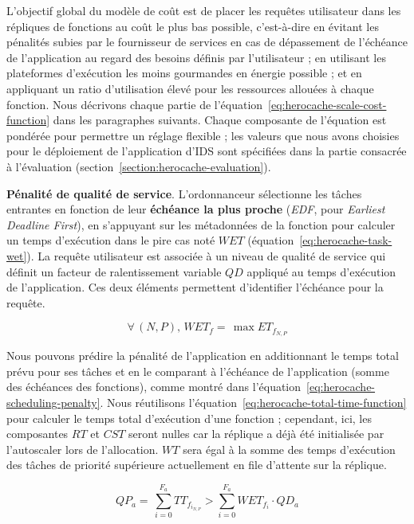 L'objectif global du modèle de coût est de placer les requêtes utilisateur dans les répliques de fonctions au coût le plus bas possible, c'est-à-dire en évitant les pénalités subies par le fournisseur de services en cas de dépassement de l'échéance de l'application au regard des besoins définis par l'utilisateur ; en utilisant les plateformes d'exécution les moins gourmandes en énergie possible ; et en appliquant un ratio d'utilisation élevé pour les ressources allouées à chaque fonction. Nous décrivons chaque partie de l'équation~\ref{eq:herocache-scale-cost-function} dans les paragraphes suivants. Chaque composante de l'équation est pondérée pour permettre un réglage flexible ; les valeurs que nous avons choisies pour le déploiement de l'application d'IDS sont spécifiées dans la partie consacrée à l'évaluation (section~\ref{section:herocache-evaluation}).

\textbf{Pénalité de qualité de service}. L'ordonnanceur sélectionne les tâches entrantes en fonction de leur \textbf{échéance la plus proche} (\textit{EDF}, pour \textit{Earliest Deadline First}), en s'appuyant sur les métadonnées de la fonction pour calculer un temps d'exécution dans le pire cas noté $WET$ (équation~\ref{eq:herocache-task-wet}). La requête utilisateur est associée à un niveau de qualité de service qui définit un facteur de ralentissement variable $QD$ appliqué au temps d'exécution de l'application. Ces deux éléments permettent d'identifier l'échéance pour la requête.

\begin{equation}
    \forall \, (N, P), \, WET_{f} = \, \max ET_{f_{N, P}}
\label{eq:herocache-task-wet}
\end{equation}

Nous pouvons prédire la pénalité de l'application en additionnant le temps total prévu pour ses tâches et en le comparant à l'échéance de l'application (somme des échéances des fonctions), comme montré dans l'équation~\ref{eq:herocache-scheduling-penalty}. Nous réutilisons l'équation~\ref{eq:herocache-total-time-function} pour calculer le temps total d'exécution d'une fonction ; cependant, ici, les composantes $RT$ et $CST$ seront nulles car la réplique a déjà été initialisée par l'autoscaler lors de l'allocation. $WT$ sera égal à la somme des temps d'exécution des tâches de priorité supérieure actuellement en file d'attente sur la réplique.

\begin{equation}
   QP_{a} = \, \sum_{i = 0}^{F_a} TT_{{f}_{{i}_{N, P}}} > \sum_{i = 0}^{F_a} WET_{f_{i}} \cdot QD_{a}
\label{eq:herocache-scheduling-penalty}
\end{equation}

